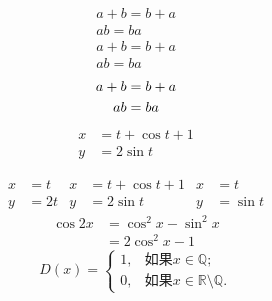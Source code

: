 \documentclass{ctexart}
\begin{document}
	\begin{gather}
		a+b=b+a\\
		ab=ba
	\end{gather}
	\begin{gather*}
		a+b=b+a\\
		ab=ba
	\end{gather*}
	\begin{gather}
		a+b=b+a \notag\\
		ab=ba 
	\end{gather}
	\begin{align}
		x&=t+\cos t+1\\
		y&=2\sin t
	\end{align}
	
	\begin{align}
	x&=t & x&=t+\cos t+1&x&=t\\
	y&=2t& y&=2\sin t   &y&=\sin t
	\end{align}
	\begin{equation}
		\begin{split}
		\cos 2x&=\cos^2 x-\sin^2 x\\
			&=2\cos^2 x-1
		\end{split}
	\end{equation}
	\begin{equation}
		D(x)=\begin{cases}
		1,&\text{如果}x\in \mathbb{Q};\\%
		0,&\text{如果}x\in \mathbb{R}\setminus\mathbb{Q}.
		\end{cases}
	\end{equation}
	
\end{document}
